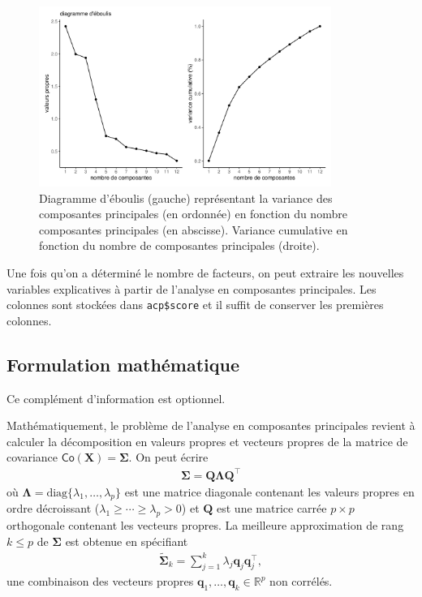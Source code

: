 \documentclass[
  11pt,
  letterpaper,
]{scrbook}
\theoremstyle{definition}
\theoremstyle{remark}
\begin{document}
\begin{figure}[ht!]

{\centering \includegraphics[width=0.85\textwidth,height=\textheight]{./02-analysefactorielle_files/figure-pdf/fig-screeplot-1.pdf}

}

\caption{\label{fig-screeplot}Diagramme d'éboulis (gauche) représentant
la variance des composantes principales (en ordonnée) en fonction du
nombre composantes principales (en abscisse). Variance cumulative en
fonction du nombre de composantes principales (droite).}

\end{figure}

Une fois qu'on a déterminé le nombre de facteurs, on peut extraire les
nouvelles variables explicatives à partir de l'analyse en composantes
principales. Les colonnes sont stockées dans \texttt{acp\$score} et il
suffit de conserver les premières colonnes.

\hypertarget{formulation-mathuxe9matique}{%
\subsection{Formulation
mathématique}\label{formulation-mathuxe9matique}}

Ce complément d'information est optionnel.

Mathématiquement, le problème de l'analyse en composantes principales
revient à calculer la décomposition en valeurs propres et vecteurs
propres de la matrice de covariance
\(\mathsf{Co}(\boldsymbol{X})=\boldsymbol{\Sigma}\). On peut écrire
\begin{align*}
\boldsymbol{\Sigma} = \boldsymbol{Q}\boldsymbol{\Lambda}\boldsymbol{Q}^\top
\end{align*} où
\(\boldsymbol{\Lambda} = \mathrm{diag}\{\lambda_1, \ldots, \lambda_p\}\)
est une matrice diagonale contenant les valeurs propres en ordre
décroissant (\(\lambda_1 \geq \cdots \geq \lambda_p > 0\)) et
\(\boldsymbol{Q}\) est une matrice carrée \(p \times p\) orthogonale
contenant les vecteurs propres. La meilleure approximation de rang
\(k \leq p\) de \(\boldsymbol{\Sigma}\) est obtenue en spécifiant
\begin{align*}
\widetilde{\boldsymbol{\Sigma}}_k = \sum_{j=1}^k \lambda_j \boldsymbol{q}_j\boldsymbol{q}_j^\top,
\end{align*} une combinaison des vecteurs propres
\(\boldsymbol{q}_1, \ldots, \boldsymbol{q}_k \in \mathbb{R}^p\) non
corrélés.
\end{document}
